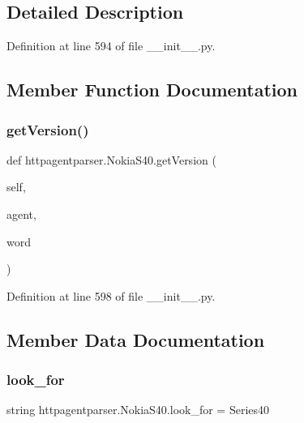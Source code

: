 \subsection{Detailed Description}


Definition at line 594 of file \+\_\+\+\_\+init\+\_\+\+\_\+.\+py.



\subsection{Member Function Documentation}
\hypertarget{classhttpagentparser_1_1_nokia_s40_a8c83ff3389c2315e40808c997c66de57}{}\label{classhttpagentparser_1_1_nokia_s40_a8c83ff3389c2315e40808c997c66de57} 
\subsubsection{\texorpdfstring{get\+Version()}{getVersion()}}
{\footnotesize\ttfamily def httpagentparser.\+Nokia\+S40.\+get\+Version (\begin{DoxyParamCaption}\item[{}]{self,  }\item[{}]{agent,  }\item[{}]{word }\end{DoxyParamCaption})}



Definition at line 598 of file \+\_\+\+\_\+init\+\_\+\+\_\+.\+py.



\subsection{Member Data Documentation}
\hypertarget{classhttpagentparser_1_1_nokia_s40_a1634490af5c8930688d2c242ea680fd3}{}\label{classhttpagentparser_1_1_nokia_s40_a1634490af5c8930688d2c242ea680fd3} 
\subsubsection{\texorpdfstring{look\+\_\+for}{look\_for}}
{\footnotesize\ttfamily string httpagentparser.\+Nokia\+S40.\+look\+\_\+for = \textquotesingle{}Series40\textquotesingle{}\hspace{0.3cm}{\ttfamily [static]}}




